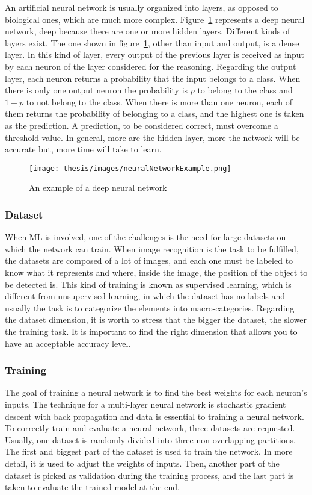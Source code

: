 \documentclass[../thesis.tex]{subfiles}
\begin{document}
An artificial neural network is usually organized into layers, as opposed to biological ones, which are much more complex.  Figure~\ref{fig:neural_network_example} represents a deep neural network, deep because there are one or more hidden layers. Different kinds of layers exist. The one shown in figure~\ref{fig:neural_network_example}, other than input and output, is a dense layer. In this kind of layer, every output of the previous layer is received as input by each neuron of the layer considered for the reasoning. Regarding the output layer, each neuron returns a probability that the input belongs to a class. When there is only one output neuron the probability is $p$ to belong to the class and $1-p$ to not belong to the class. When there is more than one neuron, each of them returns the probability of belonging to a class, and the highest one is taken as the prediction. A prediction, to be considered correct, must overcome a threshold value. In general, more are the hidden layer, more the network will be accurate but, more time will take to learn. 

\begin{figure}[H]
    \centering
    \texttt{[image: thesis/images/neuralNetworkExample.png]}
    \caption{An example of a deep neural network}
    \label{fig:neural_network_example}
\end{figure}

\subsubsection{Dataset}
When \acrshort{ML} is involved, one of the challenges is the need for large datasets on which the network can train. When image recognition is the task to be fulfilled, the datasets are composed of a lot of images, and each one must be labeled to know what it represents and where, inside the image, the position of the object to be detected is. This kind of training is known as supervised learning, which is different from unsupervised learning, in which the dataset has no labels and usually the task is to categorize the elements into macro-categories. Regarding the dataset dimension, it is worth to stress that the bigger the dataset, the slower the training task. It is important to find the right dimension that allows you to have an acceptable accuracy level. 

\subsubsection{Training}
The goal of training a neural network is to find the best weights for each neuron’s inputs. The technique for a multi-layer neural network is stochastic gradient descent with back propagation and data is essential to training a neural network. To correctly train and evaluate a neural network, three datasets are requested. Usually, one dataset is randomly divided into three non-overlapping partitions. The first and biggest part of the dataset is used to train the network. In more detail, it is used to adjust the weights of inputs. Then, another part of the dataset is picked as validation during the training process, and the last part is taken to evaluate the trained model at the end.
\end{document}
